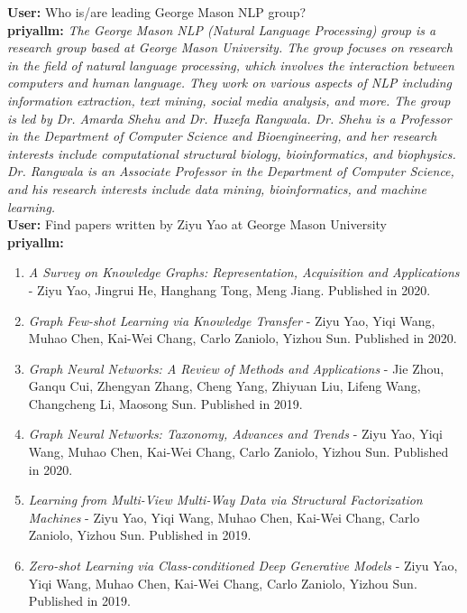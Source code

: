 \documentclass[11pt,addpoints,answers]{exam}
\begin{document}
\begin{questions}
    \begin{tcolorbox}[fit,height=10cm, width=16cm, blank, borderline={1pt}{-2pt},nobeforeafter]
    \textbf{User:} Who is/are leading George Mason NLP group?
    \\
    \textbf{priyallm:} \textit{The George Mason NLP (Natural Language Processing) group is a research group based at George Mason University. The group focuses on research in the field of natural language processing, which involves the interaction between computers and human language. They work on various aspects of NLP including information extraction, text mining, social media analysis, and more. The group is led by Dr. Amarda Shehu and Dr. Huzefa Rangwala. Dr. Shehu is a Professor in the Department of Computer Science and Bioengineering, and her research interests include computational structural biology, bioinformatics, and biophysics. Dr. Rangwala is an Associate Professor in the Department of Computer Science, and his research interests include data mining, bioinformatics, and machine learning.}
    \\
    \textbf{User:} Find papers written by Ziyu Yao at George Mason University
    \\
    \textbf{priyallm:} 
    \begin{enumerate}[label=\arabic*.]
    \item \textit{A Survey on Knowledge Graphs: Representation, Acquisition and Applications} - Ziyu Yao, Jingrui He, Hanghang Tong, Meng Jiang. Published in 2020.
    \item \textit{Graph Few-shot Learning via Knowledge Transfer} - Ziyu Yao, Yiqi Wang, Muhao Chen, Kai-Wei Chang, Carlo Zaniolo, Yizhou Sun. Published in 2020.
    \item \textit{Graph Neural Networks: A Review of Methods and Applications} - Jie Zhou, Ganqu Cui, Zhengyan Zhang, Cheng Yang, Zhiyuan Liu, Lifeng Wang, Changcheng Li, Maosong Sun. Published in 2019.
    \item \textit{Graph Neural Networks: Taxonomy, Advances and Trends} - Ziyu Yao, Yiqi Wang, Muhao Chen, Kai-Wei Chang, Carlo Zaniolo, Yizhou Sun. Published in 2020.
    \item \textit{Learning from Multi-View Multi-Way Data via Structural Factorization Machines} - Ziyu Yao, Yiqi Wang, Muhao Chen, Kai-Wei Chang, Carlo Zaniolo, Yizhou Sun. Published in 2019.
    \item \textit{Zero-shot Learning via Class-conditioned Deep Generative Models} - Ziyu Yao, Yiqi Wang, Muhao Chen, Kai-Wei Chang, Carlo Zaniolo, Yizhou Sun. Published in 2019.
\end{enumerate}


\end{tcolorbox}
\end{questions}
\end{document}
